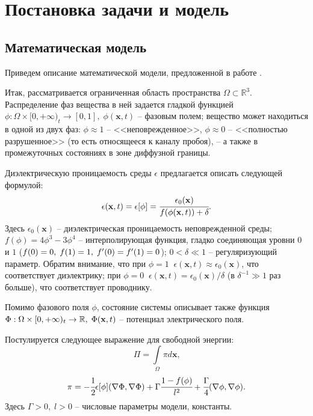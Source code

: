 
\section{Постановка задачи и модель}

\subsection{Математическая модель}

Приведем описание математической модели, предложенной в работе \cite{pitike_dielectric_breakdown}.

Итак, рассматривается ограниченная область пространства $\Omega \subset \mathbb{R}^3$. Распределение фаз вещества в ней задается гладкой функцией $\phi: \Omega \times [0, +\infty)_t \to [0, 1], \; \phi(\mathbf{x}, t)$ -- фазовым полем; вещество может находиться в одной из двух фаз: $\phi \approx 1$ -- <<неповрежденное>>, $\phi \approx 0$ -- <<полностью разрушенное>> (то есть относящееся к каналу пробоя), -- а также в промежуточных состояниях в зоне диффузной границы.

Диэлектрическую проницаемость среды $\epsilon$ предлагается описать следующей формулой:
\begin{equation}
    \epsilon(\mathbf{x}, t) = \epsilon[\phi] = \cfrac{\epsilon_0(\mathbf{x})}{f(\phi(\mathbf{x}, t)) + \delta} \text{.}
    \label{equation_epsilon}
\end{equation}
Здесь $\epsilon_0(\mathbf{x})$ -- диэлектрическая проницаемость неповрежденной среды; $f(\phi) = 4\phi^3 - 3\phi^4$ -- интерполирующая функция, гладко соединяющая уровни $0$ и $1$ ($f(0) = 0, \; f(1) \hm = 1, \; f'(0) = f'(1) = 0$); $0 < \delta \ll 1$ -- регуляризующий параметр. Обратим внимание, что при $\phi = 1 \;\; \epsilon(\mathbf{x}, t) \approx \epsilon_0(\mathbf{x})$, что соответствует диэлектрику; при $\phi = 0 \;\; \epsilon(\mathbf{x}, t) = \epsilon_0(\mathbf{x})/\delta$ \linebreak (в $\delta^{-1} \gg 1$ раз больше), что соответствует проводнику.

Помимо фазового поля $\phi$, состояние системы описывает также функция $\Phi: \Omega \hm \times [0, +\infty)_t \to \mathbb{R}, \; \Phi(\mathbf{x}, t)$ -- потенциал электрического поля.

Постулируется следующее выражение для свободной энергии:
\begin{equation}
    \Pi = \int \limits_\Omega \pi d \mathbf{x} \text{,}
    \label{equation_free_energy}
\end{equation}
\begin{equation}
    \pi = -\cfrac{1}{2} \epsilon[\phi] (\nabla \Phi, \nabla \Phi) + \Gamma \cfrac{1 - f(\phi)}{l^2} + \cfrac{\Gamma}{4} (\nabla \phi, \nabla \phi) \text{.}
    \label{equation_free_energy_density}
\end{equation}
Здесь $\Gamma > 0, \; l > 0$ -- числовые параметры модели, константы.

